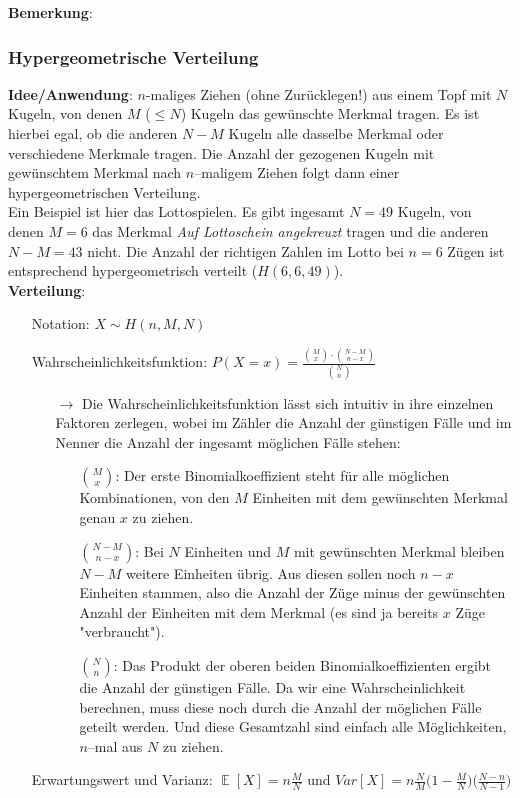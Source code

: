 \documentclass[a4paper]{article}
\DeclareMathOperator*{\E}{\mathbb{E}}
\begin{document}
\noindent \textbf{Bemerkung}: 

\subsubsection{Hypergeometrische Verteilung} \label{sec:hypergeo}

\noindent \textbf{Idee/Anwendung}: $n$-maliges Ziehen (ohne Zurücklegen!) aus einem Topf mit $N$ Kugeln, von denen $M$ ($ \leq N$) Kugeln das gewünschte Merkmal tragen. Es ist hierbei egal, ob die anderen $N-M$ Kugeln alle dasselbe Merkmal oder verschiedene Merkmale tragen. Die Anzahl der gezogenen Kugeln mit gewünschtem Merkmal nach $n$--maligem Ziehen folgt dann einer hypergeometrischen Verteilung. \\

\noindent Ein Beispiel ist hier das Lottospielen. Es gibt ingesamt $N=49$ Kugeln, von denen $M=6$ das Merkmal \textit{Auf Lottoschein angekreuzt} tragen und die anderen $N-M=43$ nicht. Die Anzahl der richtigen Zahlen im Lotto bei $n=6$ Zügen ist entsprechend hypergeometrisch verteilt ($H(6,6,49)$). \\

\noindent \textbf{Verteilung}:
\begin{itemize}
\item[] Notation: $X\sim H(n,M,N)$
\item[] Wahrscheinlichkeitsfunktion: $P(X=x)=\frac{\binom{M}{x}\cdot\binom{N-M}{n-x}}{\binom{N}{n}}$
	\begin{itemize}
	\item[$\rightarrow$] Die Wahrscheinlichkeitsfunktion lässt sich intuitiv in ihre einzelnen Faktoren zerlegen, wobei im Zähler die Anzahl der günstigen Fälle und im Nenner die Anzahl der ingesamt möglichen Fälle stehen:
		\begin{itemize}
		\item[] $\binom{M}{x}$: Der erste Binomialkoeffizient steht für alle möglichen Kombinationen, von den $M$ Einheiten mit dem gewünschten Merkmal genau $x$ zu ziehen.
		\item[] $\binom{N-M}{n-x}$: Bei $N$ Einheiten und $M$ mit gewünschten Merkmal bleiben $N-M$ weitere Einheiten übrig. Aus diesen sollen noch $n-x$ Einheiten stammen, also die Anzahl der Züge minus der gewünschten Anzahl der Einheiten mit dem Merkmal (es sind ja bereits $x$ Züge "verbraucht").
		\item[] $\binom{N}{n}$: Das Produkt der oberen beiden Binomialkoeffizienten ergibt die Anzahl der günstigen Fälle. Da wir eine Wahrscheinlichkeit berechnen, muss diese noch durch die Anzahl der möglichen Fälle geteilt werden. Und diese Gesamtzahl sind einfach alle Möglichkeiten, $n$--mal aus $N$ zu ziehen. 
		\end{itemize}
	\end{itemize}
\item[] Erwartungswert und Varianz: $\E[X]=n\frac{M}{N}$ und $Var[X]=n\frac{N}{M}\Big(1-\frac{M}{N} \Big)\Big(\frac{N-n}{N-1} \Big)$

\end{itemize}
\end{document}
